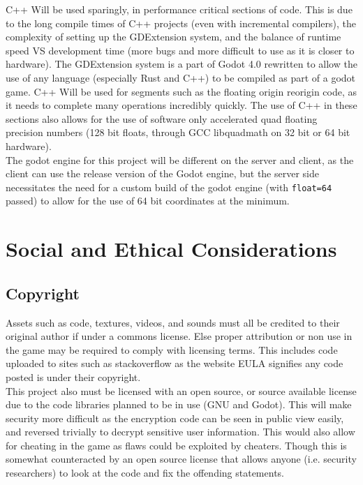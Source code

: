 \documentclass[12pt, DIV=calc]{scrartcl}
\begin{document}
\noindent C++ Will be used sparingly, in performance critical sections of code. This is due to the long compile times of C++ projects (even with incremental compilers), the complexity of setting up the GDExtension system, and the balance of runtime speed VS development time (more bugs and more difficult to use as it is closer to hardware). The GDExtension system is a part of Godot 4.0 rewritten to allow the use of any language (especially Rust and C++) to be compiled as part of a godot game. C++ Will be used for segments such as the floating origin reorigin code, as it needs to complete many operations incredibly quickly. The use of C++ in these sections also allows for the use of software only accelerated quad floating precision numbers (128 bit floats, through GCC libquadmath on 32 bit or 64 bit hardware). \\

\noindent The godot engine for this project will be different on the server and client, as the client can use the release version of the Godot engine, but the server side necessitates the need for a custom build of the godot engine (with \texttt{float=64} passed) to allow for the use of 64 bit coordinates at the minimum.  



\section{Social and Ethical Considerations}
\subsection{Copyright}
Assets such as code, textures, videos, and sounds must all be credited to their original author if under a commons license. Else proper attribution or non use in the game may be required to comply with licensing terms. This includes code uploaded to sites such as stackoverflow as the website EULA signifies any code posted is under their copyright. \\ 

\noindent This project also must be licensed with an open source, or source available license due to the code libraries planned to be in use (GNU and Godot). This will make security more difficult as the encryption code can be seen in public view easily, and reversed trivially to decrypt sensitive user information. This would also allow for cheating in the game as flaws could be exploited by cheaters. Though this is somewhat counteracted by an open source license that allows anyone (i.e. security researchers) to look at the code and fix the offending statements.
\end{document}

